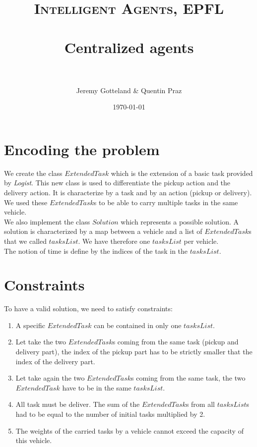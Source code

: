 \documentclass[fontsize=12pt]{scrartcl} %
\title{	
\normalfont \normalsize 
\textsc{Intelligent Agents, EPFL} \\ [20pt] %
\horrule{0.5pt} \\[0.4cm] %
\huge Centralized agents \\ %
\horrule{2pt} \\[0.5cm] %
}
\author{Jeremy Gotteland \& Quentin Praz} %
\date{\normalsize\today} %
\begin{document}
\maketitle %


\section*{Encoding the problem}
We create the class $ExtendedTask$ which is the extension of a basic task provided by \textit{Logist}. This new class is used to differentiate the pickup action and the delivery action. It is characterize by a task and by an action (pickup or delivery). We used these $ExtendedTask$s to be able to carry multiple tasks in the same vehicle.\\
We also implement the class $Solution$ which represents a possible solution. A solution is characterized by a map between a vehicle and a list of $ExtendedTask$s that we called $tasksList$. We have therefore one $tasksList$ per vehicle.\\
The notion of time is define by the indices of the task in the $tasksList$.

\section*{Constraints}
To have a valid solution, we need to satisfy constraints:
\begin{enumerate}
\item A specific $ExtendedTask$ can be contained in only one $tasksList$.
\item Let take the two $ExtendedTask$s coming from the same task (pickup and delivery part), the index of the pickup part has to be strictly smaller that the index of the delivery part.
\item Let take again the two $ExtendedTask$s coming from the same task, the two $ExtendedTask$ have to be in the same $tasksList$.
\item All task must be deliver. The sum of the $ExtendedTask$s from all $tasksList$s had to be equal to the number of initial tasks multiplied by 2.
\item The weights of the carried tasks by a vehicle cannot exceed the capacity of this vehicle. 
\end{enumerate}
\end{document}

